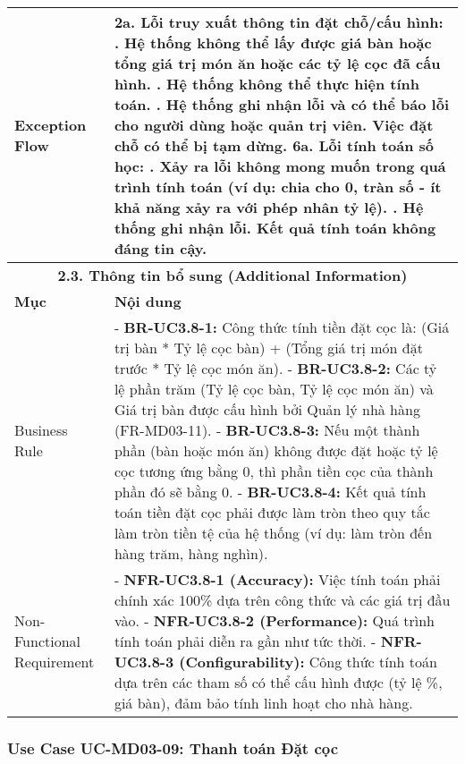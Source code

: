\begin{longtable}{|m{4cm}|p{11cm}|}
\hline
Exception Flow & \textbf{2a. Lỗi truy xuất thông tin đặt chỗ/cấu hình:} \newline    1. Hệ thống không thể lấy được giá bàn hoặc tổng giá trị món ăn hoặc các tỷ lệ cọc đã cấu hình. \newline    2. Hệ thống không thể thực hiện tính toán. \newline    3. Hệ thống ghi nhận lỗi và có thể báo lỗi cho người dùng hoặc quản trị viên. Việc đặt chỗ có thể bị tạm dừng. \newline \textbf{6a. Lỗi tính toán số học:} \newline    1. Xảy ra lỗi không mong muốn trong quá trình tính toán (ví dụ: chia cho 0, tràn số - ít khả năng xảy ra với phép nhân tỷ lệ). \newline    2. Hệ thống ghi nhận lỗi. Kết quả tính toán không đáng tin cậy. \\
\hline
\multicolumn{2}{|c|}{\textbf{2.3. Thông tin bổ sung (Additional Information)}} \\
\hline
\textbf{Mục} & \textbf{Nội dung} \\
\hline
Business Rule & - \textbf{BR-UC3.8-1:} Công thức tính tiền đặt cọc là: (Giá trị bàn * Tỷ lệ cọc bàn) + (Tổng giá trị món đặt trước * Tỷ lệ cọc món ăn). \newline - \textbf{BR-UC3.8-2:} Các tỷ lệ phần trăm (Tỷ lệ cọc bàn, Tỷ lệ cọc món ăn) và Giá trị bàn được cấu hình bởi Quản lý nhà hàng (FR-MD03-11). \newline - \textbf{BR-UC3.8-3:} Nếu một thành phần (bàn hoặc món ăn) không được đặt hoặc tỷ lệ cọc tương ứng bằng 0, thì phần tiền cọc của thành phần đó sẽ bằng 0. \newline - \textbf{BR-UC3.8-4:} Kết quả tính toán tiền đặt cọc phải được làm tròn theo quy tắc làm tròn tiền tệ của hệ thống (ví dụ: làm tròn đến hàng trăm, hàng nghìn). \\
\hline
Non-Functional Requirement & - \textbf{NFR-UC3.8-1 (Accuracy):} Việc tính toán phải chính xác 100\% dựa trên công thức và các giá trị đầu vào. \newline - \textbf{NFR-UC3.8-2 (Performance):} Quá trình tính toán phải diễn ra gần như tức thời. \newline - \textbf{NFR-UC3.8-3 (Configurability):} Công thức tính toán dựa trên các tham số có thể cấu hình được (tỷ lệ \%, giá bàn), đảm bảo tính linh hoạt cho nhà hàng. \\
\hline
\end{longtable}

\subsubsection{Use Case UC-MD03-09: Thanh toán Đặt cọc}

